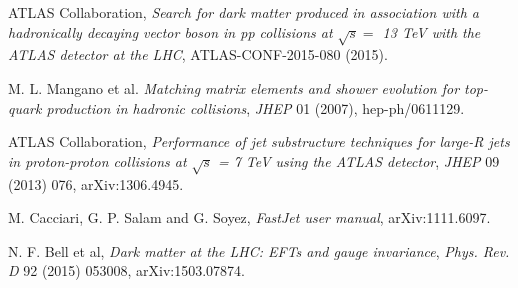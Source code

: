 ATLAS Collaboration, \emph{Search for dark matter produced in association with a hadronically decaying vector boson in pp collisions at $\sqrt{s}=$ 13 TeV with the ATLAS detector at the LHC}, ATLAS-CONF-2015-080 (2015).

M. L. Mangano et al. \emph{Matching matrix elements and shower evolution for top-quark production in hadronic collisions}, \emph{JHEP} 01 (2007), hep-ph/0611129.

ATLAS Collaboration, \emph{Performance of jet substructure techniques for large-R jets in proton-proton collisions at $\sqrt{s}$ = 7 TeV using the ATLAS detector}, \emph{JHEP} 09 (2013) 076, arXiv:1306.4945.

M. Cacciari, G. P. Salam and G. Soyez, \emph{FastJet user manual}, arXiv:1111.6097.

N. F. Bell et al, \emph{Dark matter at the LHC: EFTs and gauge invariance}, \emph{Phys. Rev. D} 92 (2015) 053008, arXiv:1503.07874.
